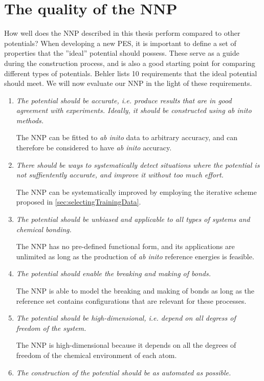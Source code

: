 \documentclass[twoside,english]{uiofysmaster}
\begin{document}
\chapter{The quality of the NNP}
How well does the NNP described in this thesis perform compared to other potentials? 
When developing a new PES, it is important to define a set of properties that the ''ideal'' potential 
should possess. These serve as a guide during the construction process, and is also a good 
starting point for comparing different types of potentials. Behler \cite{Behler11general} lists 10 requirements
that the ideal potential should meet. We will now evaluate our NNP in the light of these requirements. 
\begin{enumerate}
 \item \textit{The potential should be accurate, i.e. produce results that are in good agreement with experiments. 
       Ideally, it should be constructed using \textit{ab inito} methods.} 
       
       The NNP can be fitted to \textit{ab inito} data to arbitrary accuracy, and 
       can therefore be considered to have \textit{ab inito} accuracy.  
 \item \textit{There should be ways to systematically detect situations where the potential is not suffientently accurate, 
       and improve it without too much effort.} 
       
       The NNP can be systematically improved by employing the iterative scheme proposed in \autoref{sec:selectingTrainingData}.
 \item \textit{The potential should be unbiased and applicable to all types of systems and chemical bonding.} 
       
       The NNP has no pre-defined functional form, and its applications are unlimited as 
       long as the production of \textit{ab inito} reference energies is feasible. 
 \item \textit{The potential should enable the breaking and making of bonds.}
       
       The NNP is able to model the breaking and making of bonds as long as the reference set contains
       configurations that are relevant for these processes.  
 \item \textit{The potential should be high-dimensional, i.e. depend on all degress of freedom of the system.}
       
       The NNP is high-dimensional because it depends on all the degrees of freedom of the chemical environment of each atom. 
 \item \textit{The construction of the potential should be as automated as possible.} 
       

\end{enumerate}
\end{document}
